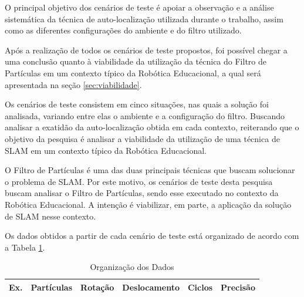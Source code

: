 
O principal objetivo dos cenários de teste é apoiar a observação e a análise sistemática da técnica de auto-localização utilizada durante o trabalho, assim como as diferentes configurações do ambiente e
do filtro utilizado.

Após a realização de todos os cenários de teste propostos, foi possível chegar a uma conclusão quanto à viabilidade da utilização da técnica do Filtro de Partículas em um contexto típico da Robótica Educacional, a qual
será apresentada na seção \ref{sec:viabilidade}.

Os cenários de teste consistem em cinco situações, nas quais a solução foi analisada, variando entre elas o ambiente e a configuração do filtro. Buscando
analisar a exatidão da auto-localização obtida em cada contexto, reiterando que o objetivo da pesquisa é analisar a viabilidade da utilização
de uma técnica de SLAM em um contexto típico da Robótica Educacional.

O Filtro de Partículas é uma das duas principais técnicas que buscam solucionar o problema
de SLAM. Por este motivo, os cenários de teste desta pesquisa buscam analisar o Filtro de Partículas, sendo esse executado no contexto da Robótica Educacional.
A intenção é viabilizar, em parte, a aplicação da solução de SLAM nesse contexto.

Os dados obtidos a partir de cada cenário de teste está organizado de acordo com a Tabela \ref{tab:org_dados}.

\begin{table}[H]
  \centering
  \caption{Organização dos Dados}
  \label{tab:org_dados}
  \begin{tabular}{|c|c|c|c|c|c|}
  \hline
  \textbf{Ex.} & \textbf{Partículas} & \textbf{Rotação} & \textbf{Deslocamento} & \textbf{Ciclos} & \textbf{Precisão} \\ \hline
  \end{tabular}
\end{table}

